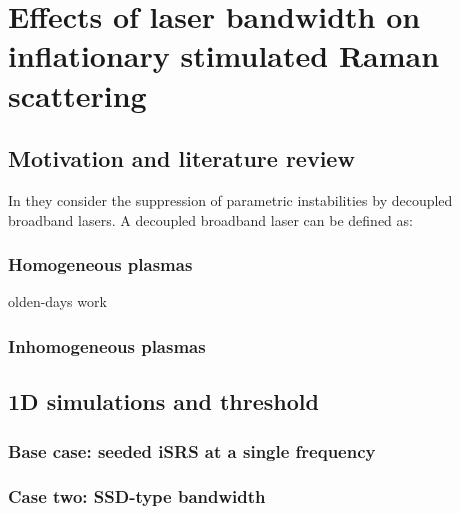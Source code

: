 \chapter{Effects of laser bandwidth on inflationary stimulated Raman scattering}
\label{chp:broadbandSRS}

\section{Motivation and literature review}

In \cite{zhao_suppression_2019} they consider the suppression of parametric 
instabilities by decoupled broadband lasers. A decoupled broadband laser can be
defined as:


\subsection{Homogeneous plasmas}
olden-days work\cite{Thomson1974}
\subsection{Inhomogeneous plasmas}
\section{1D simulations and threshold}
\subsection{Base case: seeded iSRS at a single frequency}
\subsection{Case two: SSD-type bandwidth}
